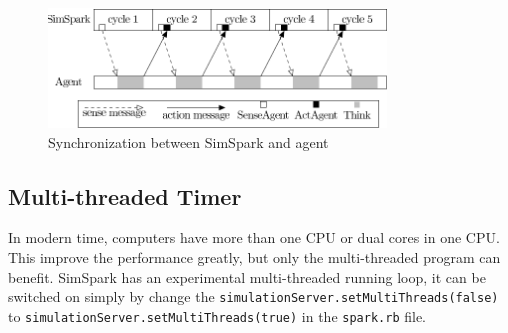 \begin{figure}[htp]
  \centering
  \includegraphics[width=0.8\textwidth]{fig/synchronization}
  \caption{Synchronization between SimSpark and agent}
  \label{fig:synchronization}
\end{figure}





\subsection{Multi-threaded Timer}
In modern time, computers have more than one CPU or dual cores in one
CPU. This improve the performance greatly, but only the multi-threaded
program can benefit. SimSpark has an experimental multi-threaded
running loop, it can be switched on simply by change the
\texttt{simulationServer.setMultiThreads(false)} to
\texttt{simulationServer.setMultiThreads(true)} in the
\texttt{spark.rb} file.

